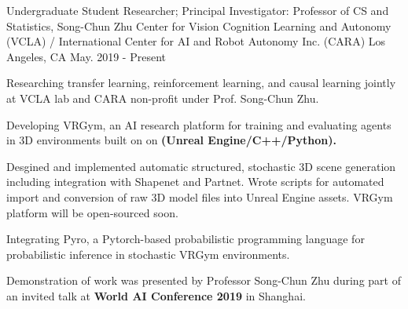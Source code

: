 

\begin{cventries}

  \cventry
    {Undergraduate Student Researcher; Principal Investigator: Professor of CS and Statistics, Song-Chun Zhu} %
    {Center for Vision Cognition Learning and Autonomy (VCLA) / \newline
    International Center for AI and Robot Autonomy Inc. (CARA)} %
    {Los Angeles, CA} %
    {May. 2019 - Present} %
    {
      \begin{cvitems} %
        \item {Researching transfer learning, reinforcement learning, and causal learning jointly at VCLA lab and CARA non-profit under Prof. Song-Chun Zhu.}
        \item {Developing VRGym, an AI research platform for training and evaluating agents in
        3D environments built on on \textbf{(Unreal Engine/C++/Python).} } 
        \item {Desgined and implemented automatic structured, stochastic 3D scene generation including integration with Shapenet and Partnet. 
        Wrote scripts for automated import and conversion of raw 3D model files into Unreal Engine assets. VRGym platform will be open-sourced soon.}
        \item {Integrating Pyro, a Pytorch-based probabilistic programming language for probabilistic inference in stochastic VRGym environments.}
        \item {Demonstration of work was presented by Professor Song-Chun Zhu during part of an invited talk at \textbf{World AI Conference 2019} in Shanghai.}
      \end{cvitems}
    }


\end{cventries}
